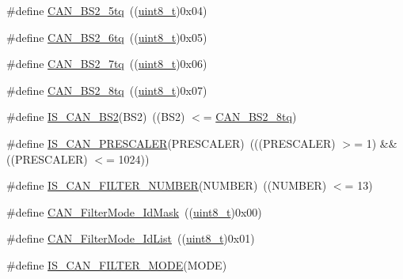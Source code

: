 \begin{DoxyCompactItemize}
\item 
\#define \hyperlink{group___c_a_n__time__quantum__in__bit__segment__2_ga89feba32bcc2e909f858d535edaad101}{C\+A\+N\+\_\+\+B\+S2\+\_\+5tq}~((\hyperlink{_p_e___types_8h_aba7bc1797add20fe3efdf37ced1182c5}{uint8\+\_\+t})0x04)
\item 
\#define \hyperlink{group___c_a_n__time__quantum__in__bit__segment__2_ga72c3245b794d3238763d1ec319bf386f}{C\+A\+N\+\_\+\+B\+S2\+\_\+6tq}~((\hyperlink{_p_e___types_8h_aba7bc1797add20fe3efdf37ced1182c5}{uint8\+\_\+t})0x05)
\item 
\#define \hyperlink{group___c_a_n__time__quantum__in__bit__segment__2_ga8005adaef02fb90e400909de08dec031}{C\+A\+N\+\_\+\+B\+S2\+\_\+7tq}~((\hyperlink{_p_e___types_8h_aba7bc1797add20fe3efdf37ced1182c5}{uint8\+\_\+t})0x06)
\item 
\#define \hyperlink{group___c_a_n__time__quantum__in__bit__segment__2_gaad8dcbb266cf5074bfb67bd7108597c6}{C\+A\+N\+\_\+\+B\+S2\+\_\+8tq}~((\hyperlink{_p_e___types_8h_aba7bc1797add20fe3efdf37ced1182c5}{uint8\+\_\+t})0x07)
\item 
\#define \hyperlink{group___c_a_n__time__quantum__in__bit__segment__2_ga3f5620b1d094dbd7d2fb8d16f4b187a9}{I\+S\+\_\+\+C\+A\+N\+\_\+\+B\+S2}(B\+S2)~((B\+S2) $<$= \hyperlink{openmotestm_2library_2inc_2stm32f10x__can_8h_aad8dcbb266cf5074bfb67bd7108597c6}{C\+A\+N\+\_\+\+B\+S2\+\_\+8tq})
\item 
\#define \hyperlink{group___c_a_n__clock__prescaler_gacde6b8be6fe083a6302fc183b5ac1055}{I\+S\+\_\+\+C\+A\+N\+\_\+\+P\+R\+E\+S\+C\+A\+L\+ER}(P\+R\+E\+S\+C\+A\+L\+ER)~(((P\+R\+E\+S\+C\+A\+L\+ER) $>$= 1) \&\& ((P\+R\+E\+S\+C\+A\+L\+ER) $<$= 1024))
\item 
\#define \hyperlink{group___c_a_n__filter__number_ga28d6c98a160d71059ed9a5973de2a4ef}{I\+S\+\_\+\+C\+A\+N\+\_\+\+F\+I\+L\+T\+E\+R\+\_\+\+N\+U\+M\+B\+ER}(N\+U\+M\+B\+ER)~((N\+U\+M\+B\+ER) $<$= 13)
\item 
\#define \hyperlink{group___c_a_n__filter__mode_ga8136e518fb31fd91079e4c7c4c19c94b}{C\+A\+N\+\_\+\+Filter\+Mode\+\_\+\+Id\+Mask}~((\hyperlink{_p_e___types_8h_aba7bc1797add20fe3efdf37ced1182c5}{uint8\+\_\+t})0x00)
\item 
\#define \hyperlink{group___c_a_n__filter__mode_ga91e9144f71b15ac345ee89314711c158}{C\+A\+N\+\_\+\+Filter\+Mode\+\_\+\+Id\+List}~((\hyperlink{_p_e___types_8h_aba7bc1797add20fe3efdf37ced1182c5}{uint8\+\_\+t})0x01)
\item 
\#define \hyperlink{group___c_a_n__filter__mode_gae684565d5392c12fd333379e5ec840f8}{I\+S\+\_\+\+C\+A\+N\+\_\+\+F\+I\+L\+T\+E\+R\+\_\+\+M\+O\+DE}(M\+O\+DE)

\end{DoxyCompactItemize}
